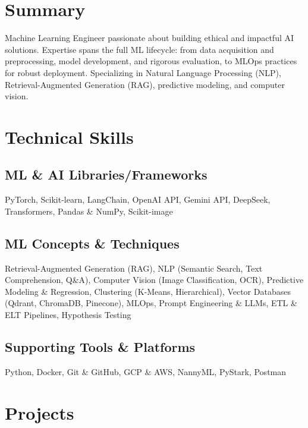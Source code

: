 \documentclass[11pt,a4paper,sans]{moderncv}
\begin{document}
\makecvtitle

\section{Summary}
Machine Learning Engineer passionate about building ethical and impactful AI solutions. Expertise spans the full ML lifecycle: from data acquisition and preprocessing, model development, and rigorous evaluation, to MLOps practices for robust deployment. Specializing in Natural Language Processing (NLP), Retrieval-Augmented Generation (RAG), predictive modeling, and computer vision.

\section{Technical Skills}
\subsection{ML \& AI Libraries/Frameworks}
PyTorch, Scikit-learn, LangChain, OpenAI API, Gemini API, DeepSeek, Transformers, Pandas \& NumPy, Scikit-image

\subsection{ML Concepts \& Techniques}
Retrieval-Augmented Generation (RAG), NLP (Semantic Search, Text Comprehension, Q\&A), Computer Vision (Image Classification, OCR), Predictive Modeling \& Regression, Clustering (K-Means, Hierarchical), Vector Databases (Qdrant, ChromaDB, Pinecone), MLOps, Prompt Engineering \& LLMs, ETL \& ELT Pipelines, Hypothesis Testing

\subsection{Supporting Tools \& Platforms}
Python, Docker, Git \& GitHub, GCP \& AWS, NannyML, PyStark, Postman

\section{Projects}
\end{document}
